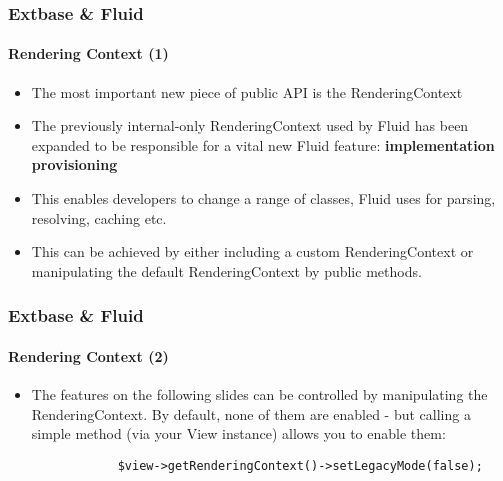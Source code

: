 
\begin{frame}[fragile]
	\frametitle{Extbase \& Fluid}
	\framesubtitle{Rendering Context (1)}

	\lstset{basicstyle=\tiny\ttfamily}

	\begin{itemize}

		\item The most important new piece of public API is the RenderingContext

		\item The previously internal-only RenderingContext used by Fluid has been
			expanded to be responsible for a vital new Fluid feature:
			\textbf{implementation provisioning}

		\item This enables developers to change a range of classes, Fluid uses for
			parsing, resolving, caching etc.

		\item This can be achieved by either including a custom RenderingContext or
			manipulating the default RenderingContext by public methods.

	\end{itemize}

\end{frame}


\begin{frame}[fragile]
	\frametitle{Extbase \& Fluid}
	\framesubtitle{Rendering Context (2)}

	\lstset{basicstyle=\smaller\ttfamily}

	\begin{itemize}

		\item The features on the following slides can be controlled by manipulating
			the RenderingContext. By default, none of them are enabled - but calling
			a simple method (via your View instance) allows you to enable them:

		\begin{lstlisting}
			$view->getRenderingContext()->setLegacyMode(false);
		\end{lstlisting}

	\end{itemize}

\end{frame}

